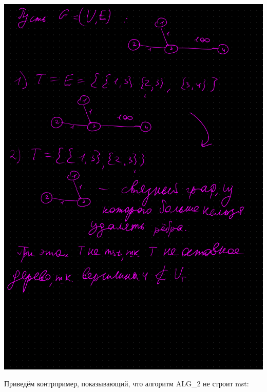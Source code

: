 \documentclass{report}
\begin{document}
\includegraphics[scale=0.7]{a1_alg1_annotated.png}

\pagebreak

Приведём контрпример, показывающий, что алгоритм ALG\_2 не строит mst:
\end{document}

